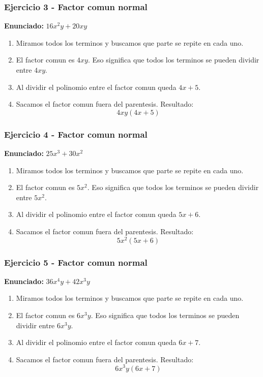 \documentclass[11pt,a4paper]{article}
\begin{document}
\vspace{0.2cm}
\subsubsection*{Ejercicio 3 - Factor comun normal}
\textbf{Enunciado:} $ 16 x^{2} y + 20 x y $\par
\begin{enumerate}[leftmargin=2em]
\item Miramos todos los terminos y buscamos que parte se repite en cada uno.
\item El factor comun es \(4 x y\). Eso significa que todos los terminos se pueden dividir entre \(4 x y\).
\item Al dividir el polinomio entre el factor comun queda \(4 x + 5\).
\item Sacamos el factor comun fuera del parentesis. Resultado: \[\boxed{4 x y\left(4 x + 5\right)}\]
\end{enumerate}

\vspace{0.2cm}
\subsubsection*{Ejercicio 4 - Factor comun normal}
\textbf{Enunciado:} $ 25 x^{3} + 30 x^{2} $\par
\begin{enumerate}[leftmargin=2em]
\item Miramos todos los terminos y buscamos que parte se repite en cada uno.
\item El factor comun es \(5 x^{2}\). Eso significa que todos los terminos se pueden dividir entre \(5 x^{2}\).
\item Al dividir el polinomio entre el factor comun queda \(5 x + 6\).
\item Sacamos el factor comun fuera del parentesis. Resultado: \[\boxed{5 x^{2}\left(5 x + 6\right)}\]
\end{enumerate}

\vspace{0.2cm}
\subsubsection*{Ejercicio 5 - Factor comun normal}
\textbf{Enunciado:} $ 36 x^{4} y + 42 x^{3} y $\par
\begin{enumerate}[leftmargin=2em]
\item Miramos todos los terminos y buscamos que parte se repite en cada uno.
\item El factor comun es \(6 x^{3} y\). Eso significa que todos los terminos se pueden dividir entre \(6 x^{3} y\).
\item Al dividir el polinomio entre el factor comun queda \(6 x + 7\).
\item Sacamos el factor comun fuera del parentesis. Resultado: \[\boxed{6 x^{3} y\left(6 x + 7\right)}\]
\end{enumerate}
\end{document}

